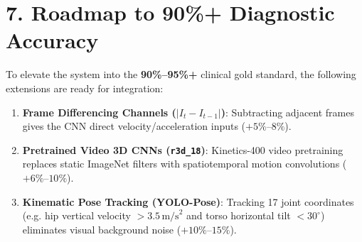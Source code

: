 \documentclass[11pt,a4paper]{article}
\begin{document}
\vspace{0.3cm}

\section{7. Roadmap to 90\%+ Diagnostic Accuracy}
To elevate the system into the \textbf{90\%--95\%+} clinical gold standard, the following extensions are ready for integration:
\begin{enumerate}
    \setlength\itemsep{0.25em}
    \item \textbf{Frame Differencing Channels ($|I_t - I_{t-1}|$)}: Subtracting adjacent frames gives the CNN direct velocity/acceleration inputs ($+5\%\text{--}8\%$).
    \item \textbf{Pretrained Video 3D CNNs (\texttt{r3d\_18})}: Kinetics-400 video pretraining replaces static ImageNet filters with spatiotemporal motion convolutions ($+6\%\text{--}10\%$).
    \item \textbf{Kinematic Pose Tracking (YOLO-Pose)}: Tracking 17 joint coordinates (e.g. hip vertical velocity $> 3.5\,\text{m/s}^2$ and torso horizontal tilt $< 30^\circ$) eliminates visual background noise ($+10\%\text{--}15\%$).
\end{enumerate}
\end{document}
